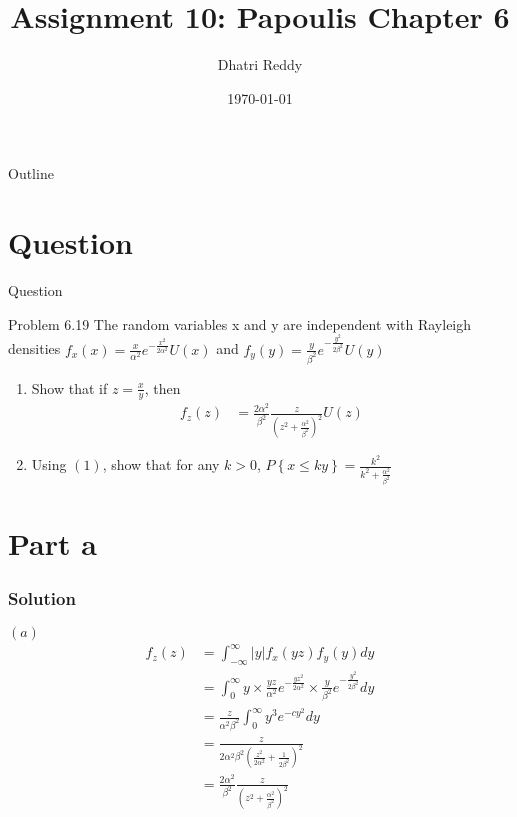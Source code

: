 \documentclass{beamer}
\title{Assignment 10: Papoulis Chapter 6 }
\author{Dhatri Reddy}
\date{\today}
\providecommand{\cbrak}[1]{\ensuremath{\left\{#1\right\}}}
\providecommand{\brak}[1]{\ensuremath{\left(#1\right)}}
\begin{document}
\begin{frame}
    \titlepage 
\end{frame}

\logo{}

\begin{frame}{Outline}
    \tableofcontents
\end{frame}

\section{Question}
\begin{frame}{Question}
    \begin{block}{Problem 6.19}
        The random variables x and y are independent with Rayleigh densities $f_{x}\brak{x} = \frac{x}{\alpha^{2}} e^{-\frac{x^{2}}{2\alpha^{2}}}U\brak{x}$ and  $f_{y}\brak{y} = \frac{y}{\beta^{2}} e^{-\frac{y^{2}}{2\beta^{2}}}U\brak{y}$
        
        \begin{enumerate}[label=(\alph*)]
        \item Show that if $z = \frac{x}{y}$, then
        \begin{align}
            f_{z}\brak{z} &= \frac{2\alpha^{2}}{\beta^{2}}\frac{z}{{\brak{z^{2} + \frac{\alpha^{2}}{\beta^{2}}}}^2} U\brak{z}
        \end{align}
        
        \item Using \brak{1}, show that for any $k > 0$,
        $P\cbrak{x \leq ky} = \frac{k^{2}}{k^{2} + \frac{\alpha^{2}}{\beta^{2}}}$
        \end{enumerate}
\end{block}
\end{frame}

\section{Part a}
\begin{frame}
\frametitle{Solution}
\brak{a}
\begin{align}
    f_{z}\brak{z} &= \int_{-\infty}^\infty\left|y\right|f_{x}\brak{yz}f_{y}\brak{y}dy\\
    &= \int_{0}^\infty y\times \frac{yz}{\alpha^{2}} e^{-\frac{yz^{2}}{2\alpha^{2}}}\times \frac{y}{\beta^{2}} e^{-\frac{y^{2}}{2\beta^{2}}}dy\\
    &= \frac{z}{\alpha^{2}\beta^{2}} \int_{0}^\infty y^{3}e^{-c y^{2}}dy\\
    &= \frac{z}{2\alpha^{2}\beta^{2}\brak{\frac{z^{2}}{2\alpha^{2}} + \frac{1}{2\beta^{2}}}^{2}}\\
    &= \frac{2\alpha^{2}}{\beta^{2}}\frac{z}{{\brak{z^{2} + \frac{\alpha^{2}}{\beta^{2}}}}^2}
\end{align}
\end{frame}
\end{document}
